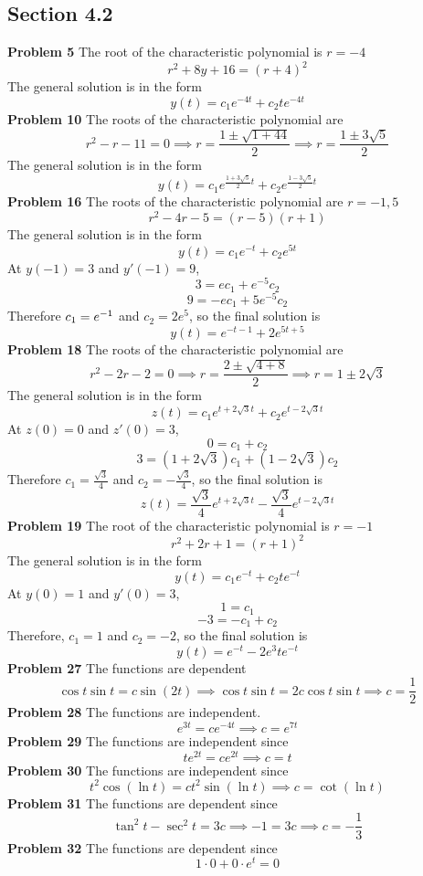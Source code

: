 \subsection*{Section 4.2}
\textbf{Problem 5}
The root of the characteristic polynomial is $r=-4$
\[
    r^2+8y+16 = (r+4)^2
\]
The general solution is in the form 
\[
    y(t) = c_1e^{-4t} + c_2te^{-4t}
\]
\textbf{Problem 10}
The roots of the characteristic polynomial are
\[
    r^2-r-11 = 0 \implies 
    r = \frac{1 \pm \sqrt{1+44}}{2} \implies 
    r = \frac{1 \pm 3\sqrt{5}}{2}
\]
The general solution is in the form
\[
    y(t) = c_1e^{\frac{1 + 3\sqrt{5}}{2}t} + c_2e^{\frac{1 - 3\sqrt{5}}{2}t}
\]
\textbf{Problem 16}
The roots of the characteristic polynomial are $r=-1,5$
\[
    r^2-4r-5 = (r-5)(r+1)
\]
The general solution is in the form 
\[
    y(t) = c_1e^{-t} + c_2e^{5t}
\]
At $y(-1) = 3$ and $y'(-1) = 9$,
\[
    3 = ec_1 + e^{-5}c_2
\]
\[
    9 = -ec_1 + 5e^{-5}c_2
\]
Therefore $c_1 = e^{-1}$ and $c_2 = 2e^5$, so the final solution is 
\[
    y(t) = e^{-t-1} + 2e^{5t+5}
\]
\textbf{Problem 18}
The roots of the characteristic polynomial are 
\[
    r^2-2r-2 = 0 \implies 
    r = \frac{2 \pm \sqrt{4+8}}{2} \implies 
    r = 1 \pm 2\sqrt{3}
\]
The general solution is in the form 
\[
    z(t) = c_1e^{t + 2\sqrt{3}t} + c_2e^{t - 2\sqrt{3}t}
\]
At $z(0) = 0$ and $z'(0) = 3$,
\[
    0 = c_1 + c_2
\]
\[
    3 = (1 + 2\sqrt{3})c_1 + (1 - 2\sqrt{3})c_2
\]
Therefore $c_1 = \frac{\sqrt{3}}{4}$ and $c_2 = -\frac{\sqrt{3}}{4}$, 
so the final solution is 
\[
    z(t) = \frac{\sqrt{3}}{4}e^{t + 2\sqrt{3}t} - \frac{\sqrt{3}}{4}e^{t - 2\sqrt{3}t}
\]
\textbf{Problem 19}
The root of the characteristic polynomial is $r=-1$
\[
    r^2+2r+1 = (r+1)^2
\]
The general solution is in the form 
\[
    y(t) = c_1e^{-t} + c_2te^{-t}
\]
At $y(0) = 1$ and $y'(0) = 3$,
\[
    1 = c_1 
\]
\[
    -3 = -c_1 + c_2
\]
Therefore, $c_1 = 1$ and $c_2 = -2$, so the final solution is 
\[
    y(t) = e^{-t} - 2e^3te^{-t}
\]
\textbf{Problem 27}
The functions are dependent
\[
    \cos t \sin t = c \sin(2t)  \implies 
    \cos t \sin t = 2c \cos t \sin t \implies 
    c = \frac{1}{2}
\]
\textbf{Problem 28}
The functions are independent.
\[
    e^{3t} = ce^{-4t} \implies
    c = e^{7t}
\]
\textbf{Problem 29}
The functions are independent since 
\[
    te^{2t} = ce^{2t} \implies 
    c = t
\]
\textbf{Problem 30}
The functions are independent since 
\[
    t^2\cos(\ln t) = ct^2\sin(\ln t) \implies 
    c = \cot(\ln t)
\]
\textbf{Problem 31}
The functions are dependent since 
\[
    \tan^2 t - \sec^2 t = 3c \implies 
    -1 = 3c \implies 
    c= -\frac{1}{3}
\]
\textbf{Problem 32}
The functions are dependent since 
\[
    1\cdot 0 + 0\cdot e^t = 0
\]